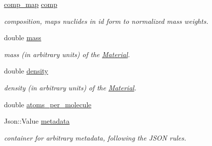 \begin{DoxyCompactItemize}
\item 
\hypertarget{classpyne_1_1_material_a2b0e850a66f2b8cb2b106307a00a18ed}{\hyperlink{namespacepyne_a86738cecccf4ce3f4ecc2ff6f45ce1a2}{comp\-\_\-map} \hyperlink{classpyne_1_1_material_a2b0e850a66f2b8cb2b106307a00a18ed}{comp}}\label{classpyne_1_1_material_a2b0e850a66f2b8cb2b106307a00a18ed}

\begin{DoxyCompactList}\small\item\em composition, maps nuclides in id form to normalized mass weights. \end{DoxyCompactList}\item 
\hypertarget{classpyne_1_1_material_a729ebba0be2879f26f1fcf3b100d3b5d}{double \hyperlink{classpyne_1_1_material_a729ebba0be2879f26f1fcf3b100d3b5d}{mass}}\label{classpyne_1_1_material_a729ebba0be2879f26f1fcf3b100d3b5d}

\begin{DoxyCompactList}\small\item\em mass (in arbitrary units) of the \hyperlink{classpyne_1_1_material}{Material}. \end{DoxyCompactList}\item 
\hypertarget{classpyne_1_1_material_a916eb7ed0143844a505c454d47755ab0}{double \hyperlink{classpyne_1_1_material_a916eb7ed0143844a505c454d47755ab0}{density}}\label{classpyne_1_1_material_a916eb7ed0143844a505c454d47755ab0}

\begin{DoxyCompactList}\small\item\em density (in arbitrary units) of the \hyperlink{classpyne_1_1_material}{Material}. \end{DoxyCompactList}\item 
double \hyperlink{classpyne_1_1_material_a7ddff1aaebc94bcda22d3422c093a756}{atoms\-\_\-per\-\_\-molecule}
\item 
\hypertarget{classpyne_1_1_material_aee299ae39a32a7ff98e14c2aa3eabe32}{Json\-::\-Value \hyperlink{classpyne_1_1_material_aee299ae39a32a7ff98e14c2aa3eabe32}{metadata}}\label{classpyne_1_1_material_aee299ae39a32a7ff98e14c2aa3eabe32}

\begin{DoxyCompactList}\small\item\em container for arbitrary metadata, following the J\-S\-O\-N rules. \end{DoxyCompactList}\end{DoxyCompactItemize}
